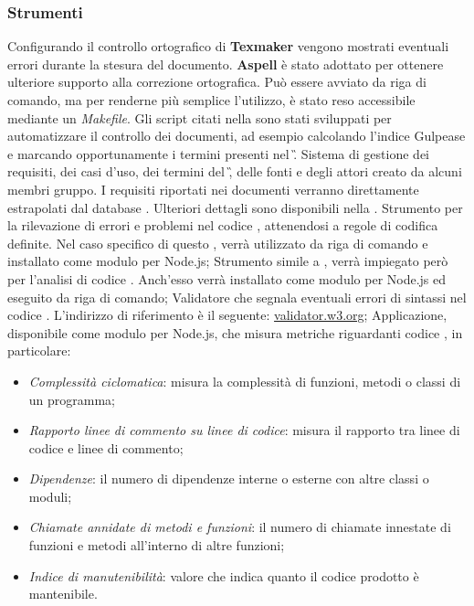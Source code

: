 \subsubsection{Strumenti}
\label{strumentiVerifica}
Configurando il controllo ortografico di \textbf{Texmaker} vengono mostrati eventuali errori durante la stesura del documento.
\textbf{Aspell} è stato adottato per ottenere ulteriore supporto alla correzione ortografica.
Può essere avviato da riga di comando, ma per renderne più semplice l'utilizzo, è stato reso accessibile mediante un \textit{Makefile}.
Gli script citati nella  sono stati sviluppati per automatizzare il controllo dei documenti,
ad esempio calcolando l'indice Gulpease e marcando opportunamente i termini presenti nel \G.
\subsubsubsubsection{\pragmadb}
Sistema di gestione dei requisiti, dei casi d'uso, dei termini del \G, delle fonti e degli attori creato
da alcuni membri gruppo. I requisiti riportati nei documenti verranno direttamente estrapolati dal database \pragmadb.
Ulteriori dettagli sono disponibili nella .
Strumento per la rilevazione di errori e problemi nel codice , attenendosi a regole di codifica definite.
Nel caso specifico di questo , \textbf{} verrà utilizzato da riga di comando e installato come modulo per Node.js;
Strumento simile a \textbf{}, verrà impiegato però per l'analisi di codice .
Anch'esso verrà installato come modulo per Node.js ed eseguito da riga di comando;
Validatore  che segnala eventuali errori di sintassi nel codice .
L'indirizzo  di riferimento è il seguente: \url{validator.w3.org};
Applicazione, disponibile come modulo per Node.js, che misura metriche riguardanti codice , in particolare:
\begin{itemize}
\item \textit{Complessità ciclomatica}: misura la complessità di funzioni, metodi o classi di un programma;
\item \textit{Rapporto linee di commento su linee di codice}: misura il rapporto tra linee di codice e linee di commento;
\item \textit{Dipendenze}: il numero di dipendenze interne o esterne con altre classi o moduli;
\item \textit{Chiamate annidate di metodi e funzioni}: il numero di chiamate innestate di funzioni e metodi all'interno di altre funzioni;
\item \textit{Indice di manutenibilità}: valore che indica quanto il codice prodotto è mantenibile.
\end{itemize}
